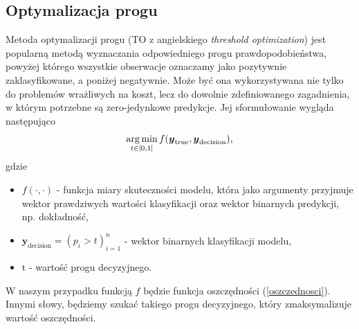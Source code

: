 \documentclass[inzynierska]{pwr_wmat_praca_dyplomowa}
\theoremstyle{plain}
\numberwithin{theorem}{chapter}
\theoremstyle{definition}
\numberwithin{theorem}{chapter}
\DeclareMathOperator*{\argmin}{arg\,min}
\begin{document}
\subsection{Optymalizacja progu}
Metoda optymalizacji progu (TO z angielskiego \textit{threshold optimization}) jest popularną metodą wyznaczania odpowiedniego progu prawdopodobieństwa, powyżej którego wszystkie obserwacje oznaczamy jako pozytywnie zaklasyfikowane, a poniżej negatywnie. Może być ona wykorzystywana nie tylko do problemów wrażliwych na koszt, lecz do dowolnie zdefiniowanego zagadnienia, w którym potrzebne są zero-jedynkowe predykcje. Jej sformułowanie wygląda następująco
$$ \argmin_{t \in [0,1]} f(\ytrue, \boldsymbol{y}_{\text{decision}}) \text{,} $$
gdzie 
\begin{itemize}
	\item $f(\cdot, \cdot) $ - funkcja miary skuteczności modelu, która jako argumenty przyjmuje wektor prawdziwych wartości klasyfikacji oraz wektor binarnych predykcji, np. dokładność,
	\item $\boldsymbol{y}_{\text{decision}} = (p_i > t)_{i=1}^n $ - wektor binarnych klasyfikacji modelu,
	\item $ \text{t} $ - wartość progu decyzyjnego.
\end{itemize}{}
W naszym przypadku funkcją $f$ będzie funkcja oszczędności (\ref{oszczednosci}). Innymi słowy, będziemy szukać takiego progu decyzyjnego, który zmaksymalizuje wartość oszczędności.
\end{document}
